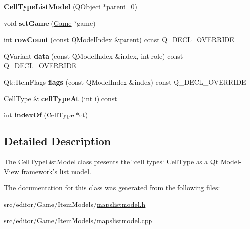 \begin{DoxyCompactItemize}
\item 
\hypertarget{class_cell_type_list_model_a38ceba3b8dc17cbea2f1847068f44772}{{\bfseries \-Cell\-Type\-List\-Model} (\-Q\-Object $\ast$parent=0)}\label{class_cell_type_list_model_a38ceba3b8dc17cbea2f1847068f44772}

\item 
\hypertarget{class_cell_type_list_model_a970065fe2cfd33eebf9c35261fa96206}{void {\bfseries set\-Game} (\hyperlink{class_game}{\-Game} $\ast$game)}\label{class_cell_type_list_model_a970065fe2cfd33eebf9c35261fa96206}

\item 
\hypertarget{class_cell_type_list_model_a4d19e3ec13380dc4ecfea9ceafdc78b9}{int {\bfseries row\-Count} (const \-Q\-Model\-Index \&parent) const \-Q\-\_\-\-D\-E\-C\-L\-\_\-\-O\-V\-E\-R\-R\-I\-D\-E}\label{class_cell_type_list_model_a4d19e3ec13380dc4ecfea9ceafdc78b9}

\item 
\hypertarget{class_cell_type_list_model_a949e9fd005335e0024fb66f63113078d}{\-Q\-Variant {\bfseries data} (const \-Q\-Model\-Index \&index, int role) const \-Q\-\_\-\-D\-E\-C\-L\-\_\-\-O\-V\-E\-R\-R\-I\-D\-E}\label{class_cell_type_list_model_a949e9fd005335e0024fb66f63113078d}

\item 
\hypertarget{class_cell_type_list_model_ac03ab37e09a24f2789ca6f9c249c7e42}{\-Qt\-::\-Item\-Flags {\bfseries flags} (const \-Q\-Model\-Index \&index) const \-Q\-\_\-\-D\-E\-C\-L\-\_\-\-O\-V\-E\-R\-R\-I\-D\-E}\label{class_cell_type_list_model_ac03ab37e09a24f2789ca6f9c249c7e42}

\item 
\hypertarget{class_cell_type_list_model_a39698441cc01a5b0ed7b6b3b629eee19}{\hyperlink{class_cell_type}{\-Cell\-Type} \& {\bfseries cell\-Type\-At} (int i) const }\label{class_cell_type_list_model_a39698441cc01a5b0ed7b6b3b629eee19}

\item 
\hypertarget{class_cell_type_list_model_aa8feab538fb4df6cfa69fcbbdf762f99}{int {\bfseries index\-Of} (\hyperlink{class_cell_type}{\-Cell\-Type} $\ast$ct)}\label{class_cell_type_list_model_aa8feab538fb4df6cfa69fcbbdf762f99}

\end{DoxyCompactItemize}


\subsection{\-Detailed \-Description}
\-The \hyperlink{class_cell_type_list_model}{\-Cell\-Type\-List\-Model} class presents the \char`\"{}cell types\char`\"{} \hyperlink{class_cell_type}{\-Cell\-Type} as a \-Qt \-Model-\/\-View framework's list model. 

\-The documentation for this class was generated from the following files\-:\begin{DoxyCompactItemize}
\item 
src/editor/\-Game/\-Item\-Models/\hyperlink{mapslistmodel_8h}{mapslistmodel.\-h}\item 
src/editor/\-Game/\-Item\-Models/mapslistmodel.\-cpp\end{DoxyCompactItemize}

